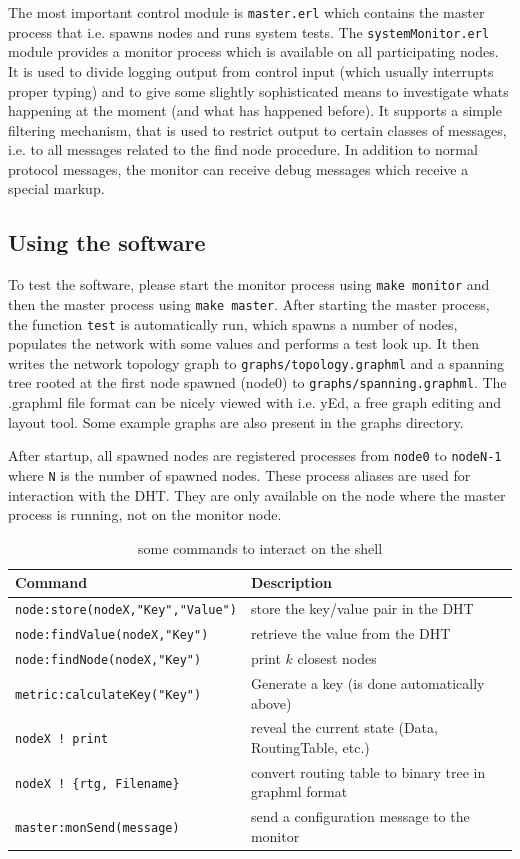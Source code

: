 \documentclass[a4paper,10pt,notitlepage]{article}
\begin{document}
The most important control module is \texttt{master.erl} which contains the master process that i.e. spawns nodes and runs system tests.
The \texttt{systemMonitor.erl} module provides a monitor process which is available on all participating nodes.
It is used to divide logging output from control input (which usually interrupts proper typing) and to give some slightly sophisticated means to investigate whats happening at the moment (and what has happened before).
It supports a simple filtering mechanism, that is used to restrict output to certain classes of messages, i.e. to all messages related to the find node procedure.
In addition to normal protocol messages, the monitor can receive debug messages which receive a special markup.

\subsection{Using the software}
To test the software, please start the monitor process using \texttt{make monitor} and then the master process using \texttt{make master}.
After starting the master process, the function \texttt{test} is automatically run, which spawns a number of nodes, populates the network with some values and performs a test look up.
It then writes the network topology graph to \texttt{graphs/topology.graphml} and a spanning tree rooted at the first node spawned (node0) to \texttt{graphs/spanning.graphml}.
The .graphml file format can be nicely viewed with i.e. yEd, a free graph editing and layout tool.
Some example graphs are also present in the graphs directory.

After startup, all spawned nodes are registered processes from \texttt{node0} to \texttt{nodeN-1} where \texttt{N} is the number of spawned nodes.
These process aliases are used for interaction with the DHT.
They are only available on the node where the master process is running, not on the monitor node.
\begin{table}[htdp]
\begin{center}
\begin{tabular}{ll}
Command & Description\\
\hline
\texttt{node:store(nodeX,"Key","Value")} & store the key/value pair in the DHT\\
\texttt{node:findValue(nodeX,"Key")} & retrieve the value from the DHT\\
\texttt{node:findNode(nodeX,"Key")} & print $k$ closest nodes\\
\texttt{metric:calculateKey("Key")} & Generate a key (is done automatically above)\\
\texttt{nodeX ! print} & reveal the current state (Data, RoutingTable, etc.)\\
\texttt{nodeX ! \{rtg, Filename\}} & convert routing table to binary tree in graphml format\\
\texttt{master:monSend(message)} & send a configuration message to the monitor
\end{tabular}
\end{center}
\caption{some commands to interact on the shell}
\label{default}
\end{table}%
\end{document}
